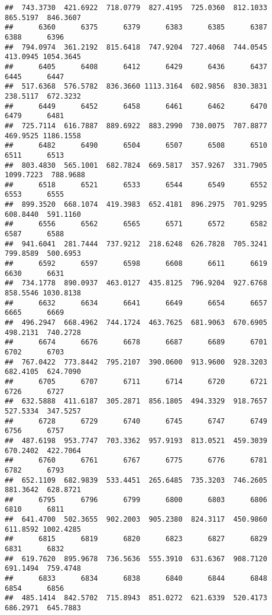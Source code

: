 \documentclass[
]{article}
\begin{document}
\begin{verbatim}
##  743.3730  421.6922  718.0779  827.4195  725.0360  812.1033  865.5197  846.3607 
##      6360      6375      6379      6383      6385      6387      6388      6396 
##  794.0974  361.2192  815.6418  747.9204  727.4068  744.0545  413.0945 1054.3645 
##      6405      6408      6412      6429      6436      6437      6445      6447 
##  517.6368  576.5782  836.3660 1113.3164  602.9856  830.3831  238.5117  672.3232 
##      6449      6452      6458      6461      6462      6470      6479      6481 
##  725.7114  616.7887  889.6922  883.2990  730.0075  707.8877  469.9525 1186.1558 
##      6482      6490      6504      6507      6508      6510      6511      6513 
##  803.4830  565.1001  682.7824  669.5817  357.9267  331.7905 1099.7223  788.9688 
##      6518      6521      6533      6544      6549      6552      6553      6555 
##  899.3520  668.1074  419.3983  652.4181  896.2975  701.9295  608.8440  591.1160 
##      6556      6562      6565      6571      6572      6582      6587      6588 
##  941.6041  281.7444  737.9212  218.6248  626.7828  705.3241  799.8589  500.6953 
##      6592      6597      6598      6608      6611      6619      6630      6631 
##  734.1778  890.0937  463.0127  435.8125  796.9204  927.6768  858.5546 1030.8138 
##      6632      6634      6641      6649      6654      6657      6665      6669 
##  496.2947  668.4962  744.1724  463.7625  681.9063  670.6905  498.2131  740.2728 
##      6674      6676      6678      6687      6689      6701      6702      6703 
##  767.0422  773.8442  795.2107  390.0600  913.9600  928.3203  682.4105  624.7090 
##      6705      6707      6711      6714      6720      6721      6726      6727 
##  632.5888  411.6187  305.2871  856.1805  494.3329  918.7657  527.5334  347.5257 
##      6728      6729      6740      6745      6747      6749      6756      6757 
##  487.6198  953.7747  703.3362  957.9193  813.0521  459.3039  670.2402  422.7064 
##      6760      6761      6767      6775      6776      6781      6782      6793 
##  652.1109  682.9839  533.4451  265.6485  735.3203  746.2605  881.3642  628.8721 
##      6795      6796      6799      6800      6803      6806      6810      6811 
##  641.4700  502.3655  902.2003  905.2380  824.3117  450.9860  611.8592 1002.4285 
##      6815      6819      6820      6823      6827      6829      6831      6832 
##  619.7620  895.9678  736.5636  555.3910  631.6367  908.7120  691.1494  759.4748 
##      6833      6834      6838      6840      6844      6848      6854      6856 
##  485.1414  842.5702  715.8943  851.0272  621.6339  520.4173  686.2971  645.7883 

\end{verbatim}
\end{document}

